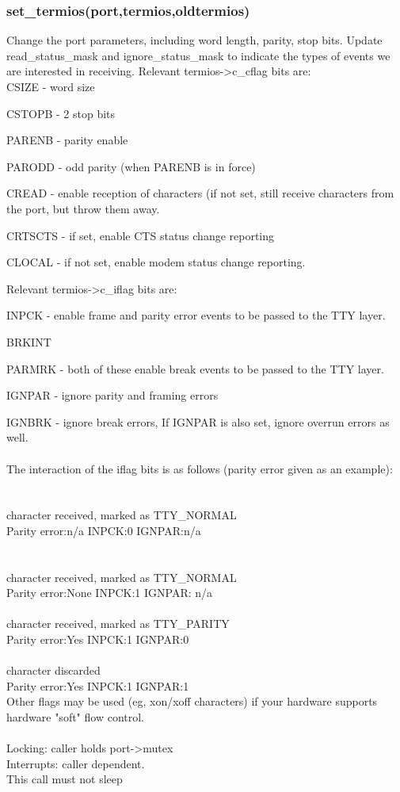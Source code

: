 \documentclass[12pt,a4paper]{article}
\begin{document}
\subsubsection{set\_termios(port,termios,oldtermios)}
	Change the port parameters, including word length, parity, stop
	bits.  Update read\_status\_mask and ignore\_status\_mask to indicate
	the types of events we are interested in receiving.  Relevant
	termios-\textgreater c\_cflag bits are:\\
		CSIZE	- word size
		
		CSTOPB	- 2 stop bits
		
		PARENB	- parity enable
		
		PARODD	- odd parity (when PARENB is in force)
		
		CREAD	- enable reception of characters (if not set,
			 still receive characters from the port, but
			  throw them away.
			  
		CRTSCTS	- if set, enable CTS status change reporting
		
		CLOCAL	- if not set, enable modem status change
			  reporting.
			  
	Relevant termios-\textgreater c\_iflag bits are:
	
		INPCK	- enable frame and parity error events to be
			  passed to the TTY layer.
			  
		BRKINT
		
		PARMRK	- both of these enable break events to be
			  passed to the TTY layer.
			  
		IGNPAR	- ignore parity and framing errors
		
		IGNBRK	- ignore break errors,  If IGNPAR is also
			  set, ignore overrun errors as well.\\ \\
	The interaction of the iflag bits is as follows (parity error
	given as an example):\\ \\
\\ character received, marked as TTY\_NORMAL\\
Parity error:n/a	 INPCK:0	 IGNPAR:n/a	\\ \\
\\character received, marked as TTY\_NORMAL\\
Parity error:None INPCK:1	IGNPAR: n/a	\\ \\
character received, marked as TTY\_PARITY\\
Parity error:Yes	 INPCK:1	 IGNPAR:0\\ \\
character discarded\\
Parity error:Yes	 INPCK:1	 IGNPAR:1	\\
Other flags may be used (eg, xon/xoff characters) if your
hardware supports hardware "soft" flow control.\\ \\
Locking: caller holds port-\textgreater mutex\\
Interrupts: caller dependent.\\
This call must not sleep\\
\end{document}
